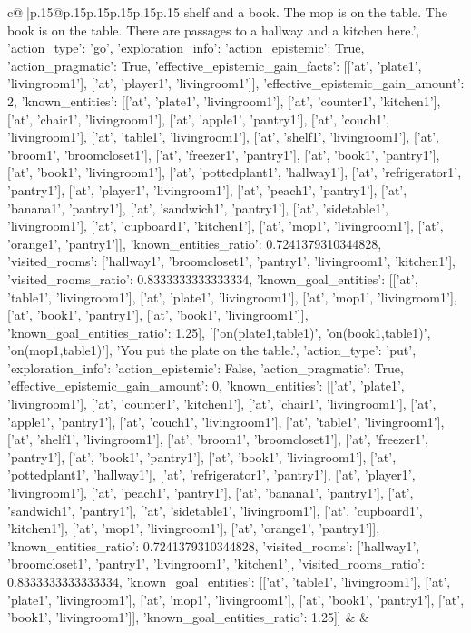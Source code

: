 \documentclass{article}
\begin{document}
{\begin{supertabular}{c@{$\;$}|p{.15\linewidth}@{}p{.15\linewidth}p{.15\linewidth}p{.15\linewidth}p{.15\linewidth}p{.15\linewidth}}
{{{shelf and a book. The mop is on the table. The book is on the table. There are passages to a hallway and a kitchen here.\n', {'action_type': 'go', 'exploration_info': {'action_epistemic': True, 'action_pragmatic': True, 'effective_epistemic_gain_facts': [['at', 'plate1', 'livingroom1'], ['at', 'player1', 'livingroom1']], 'effective_epistemic_gain_amount': 2, 'known_entities': [['at', 'plate1', 'livingroom1'], ['at', 'counter1', 'kitchen1'], ['at', 'chair1', 'livingroom1'], ['at', 'apple1', 'pantry1'], ['at', 'couch1', 'livingroom1'], ['at', 'table1', 'livingroom1'], ['at', 'shelf1', 'livingroom1'], ['at', 'broom1', 'broomcloset1'], ['at', 'freezer1', 'pantry1'], ['at', 'book1', 'pantry1'], ['at', 'book1', 'livingroom1'], ['at', 'pottedplant1', 'hallway1'], ['at', 'refrigerator1', 'pantry1'], ['at', 'player1', 'livingroom1'], ['at', 'peach1', 'pantry1'], ['at', 'banana1', 'pantry1'], ['at', 'sandwich1', 'pantry1'], ['at', 'sidetable1', 'livingroom1'], ['at', 'cupboard1', 'kitchen1'], ['at', 'mop1', 'livingroom1'], ['at', 'orange1', 'pantry1']], 'known_entities_ratio': 0.7241379310344828, 'visited_rooms': ['hallway1', 'broomcloset1', 'pantry1', 'livingroom1', 'kitchen1'], 'visited_rooms_ratio': 0.8333333333333334, 'known_goal_entities': [['at', 'table1', 'livingroom1'], ['at', 'plate1', 'livingroom1'], ['at', 'mop1', 'livingroom1'], ['at', 'book1', 'pantry1'], ['at', 'book1', 'livingroom1']], 'known_goal_entities_ratio': 1.25}}], [['on(plate1,table1)', 'on(book1,table1)', 'on(mop1,table1)'], 'You put the plate on the table.\n', {'action_type': 'put', 'exploration_info': {'action_epistemic': False, 'action_pragmatic': True, 'effective_epistemic_gain_amount': 0, 'known_entities': [['at', 'plate1', 'livingroom1'], ['at', 'counter1', 'kitchen1'], ['at', 'chair1', 'livingroom1'], ['at', 'apple1', 'pantry1'], ['at', 'couch1', 'livingroom1'], ['at', 'table1', 'livingroom1'], ['at', 'shelf1', 'livingroom1'], ['at', 'broom1', 'broomcloset1'], ['at', 'freezer1', 'pantry1'], ['at', 'book1', 'pantry1'], ['at', 'book1', 'livingroom1'], ['at', 'pottedplant1', 'hallway1'], ['at', 'refrigerator1', 'pantry1'], ['at', 'player1', 'livingroom1'], ['at', 'peach1', 'pantry1'], ['at', 'banana1', 'pantry1'], ['at', 'sandwich1', 'pantry1'], ['at', 'sidetable1', 'livingroom1'], ['at', 'cupboard1', 'kitchen1'], ['at', 'mop1', 'livingroom1'], ['at', 'orange1', 'pantry1']], 'known_entities_ratio': 0.7241379310344828, 'visited_rooms': ['hallway1', 'broomcloset1', 'pantry1', 'livingroom1', 'kitchen1'], 'visited_rooms_ratio': 0.8333333333333334, 'known_goal_entities': [['at', 'table1', 'livingroom1'], ['at', 'plate1', 'livingroom1'], ['at', 'mop1', 'livingroom1'], ['at', 'book1', 'pantry1'], ['at', 'book1', 'livingroom1']], 'known_goal_entities_ratio': 1.25}}]]
            }
        }
    }
    & & \\ \\


\end{supertabular}}
\end{document}
